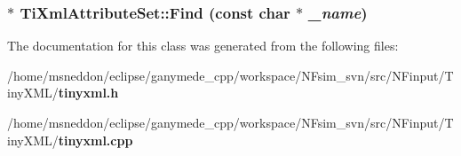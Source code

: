 \subsubsection{$\ast$ TiXmlAttributeSet::Find (const char $\ast$ {\em \_\-name})\hspace{0.3cm}{\tt  [inline]}}\label{classTiXmlAttributeSet_2f210bed54c832adf1683c44c35727b9}




The documentation for this class was generated from the following files:\begin{CompactItemize}
\item 
/home/msneddon/eclipse/ganymede\_\-cpp/workspace/NFsim\_\-svn/src/NFinput/TinyXML/{\bf tinyxml.h}\item 
/home/msneddon/eclipse/ganymede\_\-cpp/workspace/NFsim\_\-svn/src/NFinput/TinyXML/{\bf tinyxml.cpp}\end{CompactItemize}
